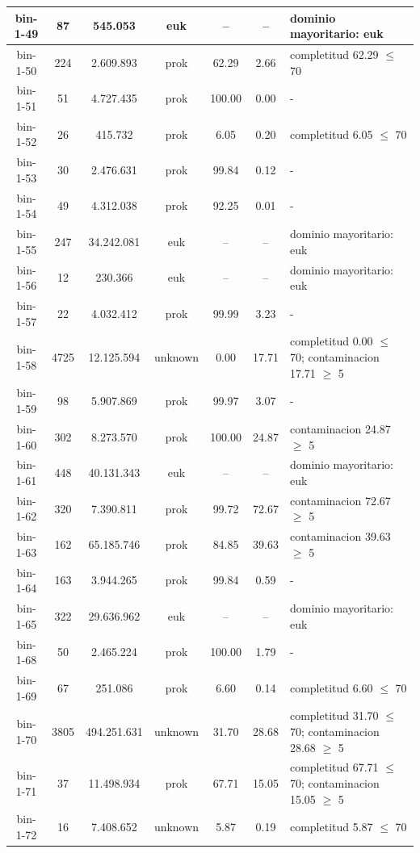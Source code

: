 \begin{xltabular}{\textwidth}{|c|c|c|c|c|c|>{\centering\arraybackslash}X|}
bin-1-49 & 87 & 545.053 & euk & -- & -- & dominio mayoritario: euk \\ \hline
bin-1-50 & 224 & 2.609.893 & prok & 62.29 & 2.66 & completitud 62.29 $\le$ 70 \\ \hline
bin-1-51 & 51 & 4.727.435 & prok & 100.00 & 0.00 & - \\ \hline
bin-1-52 & 26 & 415.732 & prok & 6.05 & 0.20 & completitud 6.05 $\le$ 70 \\ \hline
bin-1-53 & 30 & 2.476.631 & prok & 99.84 & 0.12 & - \\ \hline
bin-1-54 & 49 & 4.312.038 & prok & 92.25 & 0.01 & - \\ \hline
bin-1-55 & 247 & 34.242.081 & euk & -- & -- & dominio mayoritario: euk \\ \hline
bin-1-56 & 12 & 230.366 & euk & -- & -- & dominio mayoritario: euk \\ \hline
bin-1-57 & 22 & 4.032.412 & prok & 99.99 & 3.23 & - \\ \hline
bin-1-58 & 4725 & 12.125.594 & unknown & 0.00 & 17.71 & completitud 0.00 $\le$ 70; contaminacion 17.71 $\ge$ 5 \\ \hline
bin-1-59 & 98 & 5.907.869 & prok & 99.97 & 3.07 & - \\ \hline
bin-1-60 & 302 & 8.273.570 & prok & 100.00 & 24.87 & contaminacion 24.87 $\ge$ 5 \\ \hline
bin-1-61 & 448 & 40.131.343 & euk & -- & -- & dominio mayoritario: euk \\ \hline
bin-1-62 & 320 & 7.390.811 & prok & 99.72 & 72.67 & contaminacion 72.67 $\ge$ 5 \\ \hline
bin-1-63 & 162 & 65.185.746 & prok & 84.85 & 39.63 & contaminacion 39.63 $\ge$ 5 \\ \hline
bin-1-64 & 163 & 3.944.265 & prok & 99.84 & 0.59 & - \\ \hline
bin-1-65 & 322 & 29.636.962 & euk & -- & -- & dominio mayoritario: euk \\ \hline
bin-1-68 & 50 & 2.465.224 & prok & 100.00 & 1.79 & - \\ \hline
bin-1-69 & 67 & 251.086 & prok & 6.60 & 0.14 & completitud 6.60 $\le$ 70 \\ \hline
bin-1-70 & 3805 & 494.251.631 & unknown & 31.70 & 28.68 & completitud 31.70 $\le$ 70; contaminacion 28.68 $\ge$ 5 \\ \hline
bin-1-71 & 37 & 11.498.934 & prok & 67.71 & 15.05 & completitud 67.71 $\le$ 70; contaminacion 15.05 $\ge$ 5 \\ \hline
bin-1-72 & 16 & 7.408.652 & unknown & 5.87 & 0.19 & completitud 5.87 $\le$ 70 \\ \hline

\end{xltabular}
